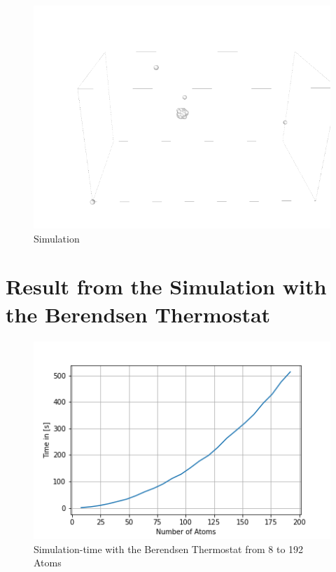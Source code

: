\begin{figure}[!h]
	\begin{center}
		\includegraphics[scale= 1]{Figure/3Image.png}
	\end{center}
	\caption[Simulation]{Simulation }
	\label{SimulationSnapshot2}
\end{figure}



\section{Result from the Simulation with the Berendsen Thermostat}

\begin{figure}[!h]
	\begin{center}
		\includegraphics[scale=1]{Figure/plotAtomTimes.png}
	\end{center}
	\caption[Simulation-time with the Berendsen Thermostat from 8 to 192 Atoms]{Simulation-time with the Berendsen Thermostat from 8 to 192 Atoms }
	\label{PlotSimulationTimeBerendsenThermostat}
\end{figure}


